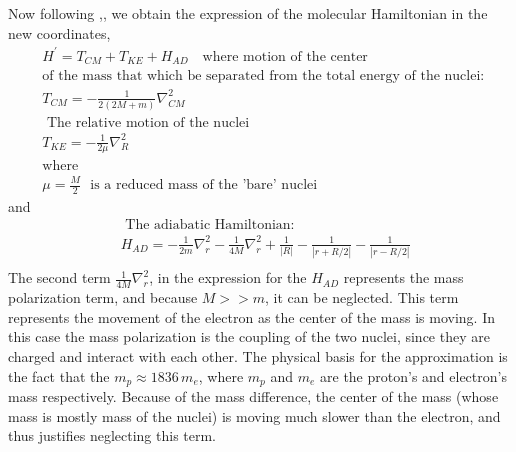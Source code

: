 Now following \cite{ZygelmanDalgarno1},\cite{Greg}, we obtain the expression of the molecular Hamiltonian in the new coordinates,
\begin{equation}
\begin{split}
& H^{'} = T_{CM} + T_{KE} + H_{AD} \,\,\,\,\text{ where motion of the center} \\[.8em]
& \text{of the mass that which be separated from the total energy of the nuclei: } \\[.8em]
& T_{CM} = -\frac{1}{2(2M +m)}\nabla_{CM}^{2} \\[.8em]
& \text{ The relative motion of the nuclei } \\[.8em]
& T_{KE} = -\frac{1}{2\mu}\nabla_R^2 \\[.8em]
& \text{where} \\[.8em]
& \mu = \frac{M}{2}\,\,\text{ is a reduced mass of the 'bare' nuclei}
\end{split}
\end{equation}
and
\begin{equation}\label{HAD}
\begin{split}
    & \text{ The adiabatic Hamiltonian: } \\[.8em]
& H_{AD} = -\frac{1}{2m}\nabla_r^2 - \frac{1}{4M}\nabla_r^2 + \frac{1}{\left|R\right|} - \frac{1}{\left|r + R/2\right|} - \frac{1}{\left|r - R/2\right|} \\[.8em]
\end{split}
\end{equation}
The second term $ \frac{1}{4M}\nabla_r^2 $, in the expression for the $ H_{AD} $ represents the mass polarization term, and because $ M >> m $, it can be neglected. This term represents the movement of the electron as the center of the mass is moving. In this case the mass polarization is the coupling of the two nuclei, since they are charged and interact with each other. 
The physical basis for the approximation is the fact that the $ m_p \approx 1836\, m_e $, where $ m_p $ and $ m_e $ are the proton's and electron's mass respectively. Because of the mass difference, the center of the mass (whose mass is mostly mass of the nuclei) is moving much slower than the electron, and thus justifies neglecting this term.

